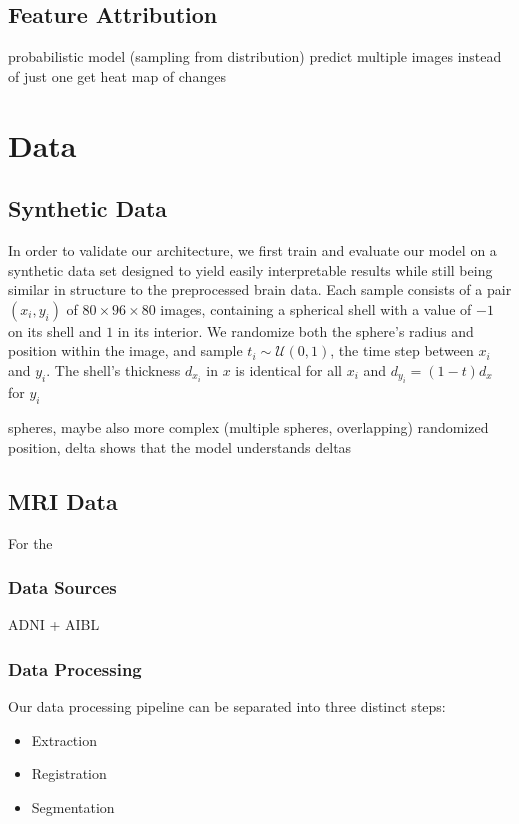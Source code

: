 \section{Feature Attribution}
probabilistic model (sampling from distribution)
predict multiple images instead of just one
get heat map of changes

\chapter{Data}

\section{Synthetic Data}
In order to validate our architecture, we first train and evaluate our model on a synthetic data set designed to yield easily interpretable results while still being similar in structure to the preprocessed brain data.
Each sample consists of a pair $(x_i, y_i)$ of $ 80 \times 96 \times 80 $ images, containing a spherical shell with a value of $-1$ on its shell and $1$ in its interior. We randomize both the sphere's radius and position within the image, and sample $t_i \sim \mathcal{U}(0, 1)$, the time step between $x_i$ and $y_i$. The shell's thickness $d_{x_i}$ in $x$ is identical for all $x_i$ and $d_{y_i} = (1-t) d_x$ for $y_i$


spheres, maybe also more complex (multiple spheres, overlapping)
randomized position, delta
shows that the model understands deltas

\section{MRI Data}
For the 

\subsection{Data Sources}

ADNI + AIBL

\subsection{Data Processing}
Our data processing pipeline can be separated into three distinct steps:

\begin{itemize}
\item Extraction
\item Registration
\item Segmentation
\end{itemize}

